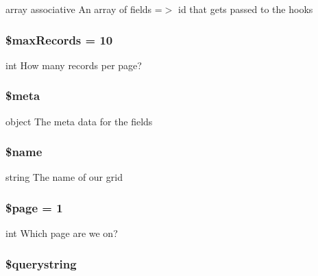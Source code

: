 array associative An array of fields =$>$ id that gets passed to the hooks \hypertarget{class_db_grid_ad48e2eb22ba0d9bef2ad4d665d9784b2}{
\subsubsection[{\$max\-Records}]{\setlength{\rightskip}{0pt plus 5cm}\$max\-Records = 10}}\label{class_db_grid_ad48e2eb22ba0d9bef2ad4d665d9784b2}
int How many records per page? \hypertarget{class_db_grid_a9e6fc1ae0498be7d1e682f8bcc9299df}{
\subsubsection[{\$meta}]{\setlength{\rightskip}{0pt plus 5cm}\$meta}}\label{class_db_grid_a9e6fc1ae0498be7d1e682f8bcc9299df}
object The meta data for the fields \hypertarget{class_db_grid_ab2fc40d43824ea3e1ce5d86dee0d763b}{
\subsubsection[{\$name}]{\setlength{\rightskip}{0pt plus 5cm}\$name\hspace{0.3cm}{\ttfamily [protected]}}}\label{class_db_grid_ab2fc40d43824ea3e1ce5d86dee0d763b}
string The name of our grid \hypertarget{class_db_grid_a0a44e6760141442bb439b1ab1395d8ff}{
\subsubsection[{\$page}]{\setlength{\rightskip}{0pt plus 5cm}\$page = 1}}\label{class_db_grid_a0a44e6760141442bb439b1ab1395d8ff}
int Which page are we on? \hypertarget{class_db_grid_a6bdad518c2534d667e646f89df728d54}{
\subsubsection[{\$querystring}]{\setlength{\rightskip}{0pt plus 5cm}\$querystring\hspace{0.3cm}{\ttfamily [protected]}}}\label{class_db_grid_a6bdad518c2534d667e646f89df728d54}
